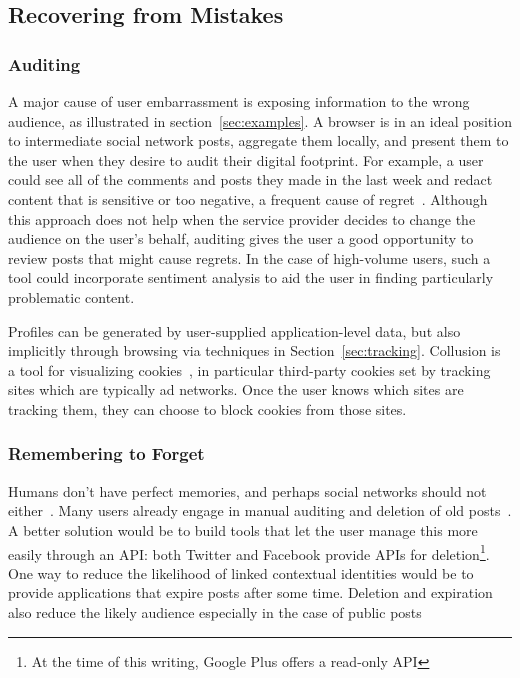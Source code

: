 \documentclass[10pt, conference, compsocconf]{IEEEtran}
\begin{document}
\subsection{Recovering from Mistakes}
\subsubsection{Auditing}
A major cause of user embarrassment is exposing information to the wrong
audience, as illustrated in section~\ref{sec:examples}. A browser is in an
ideal position to intermediate social network posts, aggregate them locally,
and present them to the user when they desire to audit their digital footprint.
For example, a user could see all of the comments and posts they made in the
last week and redact content that is sensitive or too negative, a frequent cause
of regret~\cite{wang}. 
 Although this approach does not help when the service
provider decides to change the audience on the user's behalf, auditing gives the user a good opportunity to review posts that
might cause regrets. In the case of high-volume users, such a tool could
incorporate sentiment analysis to aid the user in finding particularly
problematic content.

Profiles can be generated by user-supplied application-level data, but also
implicitly through browsing via techniques in Section~\ref{sec:tracking}. Collusion is a
tool for visualizing cookies~\cite{collusion}, in particular third-party
cookies set by tracking sites which are typically ad networks.  Once the user
knows which sites are tracking them, they can choose to block cookies from
those sites.

\subsubsection{Remembering to Forget}
Humans don't have perfect memories, and perhaps social
networks should not either~\cite{delete}. Many users already engage in manual auditing and
deletion of old posts~\cite{fbtips2}. A better solution would be to build tools
that let the user manage this more easily through an API: both Twitter and Facebook provide
APIs for deletion\footnote{At the time of this writing, Google Plus offers a
read-only API}. One way to reduce the likelihood of linked contextual
identities would be to provide applications that expire posts after some time.
Deletion and expiration also reduce the likely audience especially in the case of public posts

\begin{comment}
\cite{viegas}blogger's expectation of privacy
\end{comment}
\end{document}
